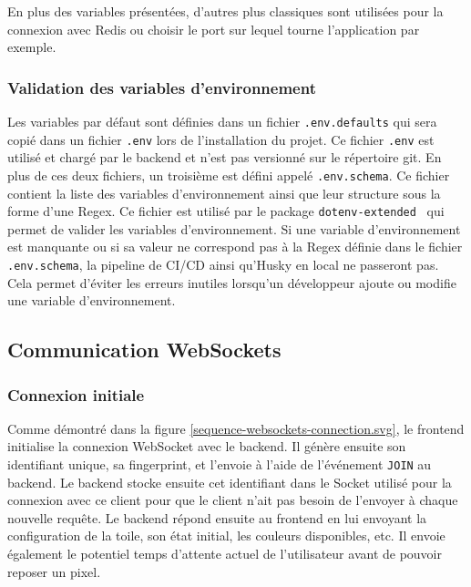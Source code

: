 En plus des variables présentées, d'autres plus classiques sont utilisées pour la connexion avec Redis ou choisir le port sur lequel tourne l'application par exemple.

\subsubsection{Validation des variables d'environnement}

Les variables par défaut sont définies dans un fichier \texttt{.env.defaults} qui sera copié dans un fichier \texttt{.env} lors de l'installation du projet. Ce fichier \texttt{.env} est utilisé et chargé par le backend et n'est pas versionné sur le répertoire git. En plus de ces deux fichiers, un troisième est défini appelé \texttt{.env.schema}. Ce fichier contient la liste des variables d'environnement ainsi que leur structure sous la forme d'une Regex. Ce fichier est utilisé par le package \texttt{dotenv-extended}~\cite{dotenv-extended} qui permet de valider les variables d'environnement. Si une variable d'environnement est manquante ou si sa valeur ne correspond pas à la Regex définie dans le fichier \texttt{.env.schema}, la pipeline de CI/CD ainsi qu'Husky en local ne passeront pas. Cela permet d'éviter les erreurs inutiles lorsqu'un développeur ajoute ou modifie une variable d'environnement.

\subsection{Communication WebSockets}
\label{section:communication-websockets}

\subsubsection{Connexion initiale}


Comme démontré dans la figure \ref{sequence-websockets-connection.svg}, le frontend initialise la connexion WebSocket avec le backend. Il génère ensuite son identifiant unique, sa fingerprint, et l'envoie à l'aide de l'événement \texttt{JOIN} au backend. Le backend stocke ensuite cet identifiant dans le Socket utilisé pour la connexion avec ce client pour que le client n'ait pas besoin de l'envoyer à chaque nouvelle requête. Le backend répond ensuite au frontend en lui envoyant la configuration de la toile, son état initial, les couleurs disponibles, etc. Il envoie également le potentiel temps d'attente actuel de l'utilisateur avant de pouvoir reposer un pixel.

